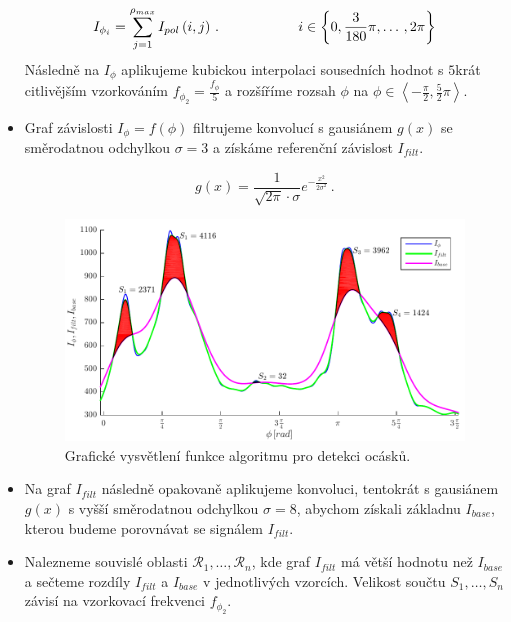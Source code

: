 \begin{itemize}
	\begin{equation}
	I_{\phi_i} = \sum_{j = 1}^{\rho_{max}} I_{pol}\left(i,j\right)\,. \hspace*{2cm} i \in \left\lbrace 0, \frac{3}{180}\pi, \dots \,,2\pi \right\rbrace
	\label{eq:Isuma}
	\end{equation}
	Následně na $I_{\phi}$ aplikujeme kubickou interpolaci sousedních hodnot s $5$krát citlivějším vzorkováním $f_{\phi_2} = \frac{f_{\phi}}{5}$ a rozšíříme rozsah $\phi$ na $\phi \in \left\langle -\frac{\pi}{2},\frac{5}{2}\pi \right\rangle$. 
	
	\item Graf závislosti $I_\phi = f(\phi)$ filtrujeme konvolucí s gausiánem $g(x)$ se směrodatnou odchylkou $\sigma = 3$ a získáme referenční závislost $I_{filt}$.
	
	\begin{equation}
		g(x) = \frac{1}{\sqrt{2\pi} \cdot \sigma}e^{-\frac{x^2}{2\sigma^2}}\,.
	\end{equation}
	
	\begin{figure}[htbp]
    \centering\includegraphics[width=\textwidth]{figures/tailex05.pdf}
     \caption[Detekce ocásků - zpracování polárního grafu.]{Grafické vysvětlení funkce algoritmu pro detekci ocásků. }
    \label{fig:tailSumGraph}
	\end{figure}
	
	\item Na graf $I_{filt}$ následně opakovaně aplikujeme konvoluci, tentokrát s gausiánem $g(x)$ s vyšší směrodatnou odchylkou $\sigma = 8$, abychom získali základnu $I_{base}$, kterou budeme porovnávat se signálem $I_{filt}$.
	
	\item Nalezneme souvislé oblasti $\mathcal{R}_1, \dots , \mathcal{R}_n$, kde graf $I_{filt}$ má větší hodnotu než $I_{base}$ a sečteme rozdíly $I_{filt}$ a $I_{base}$ v jednotlivých vzorcích. Velikost součtu $S_1, \dots , S_n$ závisí na vzorkovací frekvenci $f_{\phi_2}$.
	

\end{itemize}
